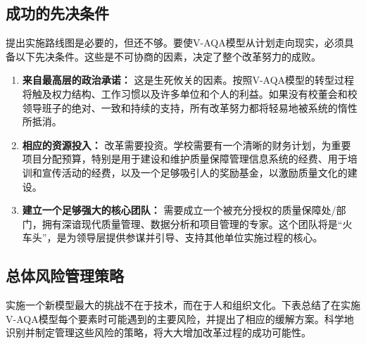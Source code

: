 \subsection{成功的先决条件}
\label{subsec:dieu_kien_thanh_cong}
提出实施路线图是必要的，但还不够。要使V-AQA模型从计划走向现实，必须具备以下先决条件。这些是不可协商的因素，决定了整个改革努力的成败。
\begin{enumerate}
    \item \textbf{来自最高层的政治承诺：} 这是生死攸关的因素。按照V-AQA模型的转型过程将触及权力结构、工作习惯以及许多单位和个人的利益。如果没有校董会和校领导班子的绝对、一致和持续的支持，所有改革努力都将轻易地被系统的惰性所抵消。
    
    \item \textbf{相应的资源投入：} 改革需要投资。学校需要有一个清晰的财务计划，为重要项目分配预算，特别是用于建设和维护质量保障管理信息系统的经费、用于培训和宣传活动的经费，以及一个足够吸引人的奖励基金，以激励质量文化的建设。
    
    \item \textbf{建立一个足够强大的核心团队：} 需要成立一个被充分授权的质量保障处/部门，拥有深谙现代质量管理、数据分析和项目管理的专家。这个团队将是“火车头”，是为领导层提供参谋并引导、支持其他单位实施过程的核心。
\end{enumerate}

\subsection{总体风险管理策略}
\label{subsec:quan_ly_rui_ro}
实施一个新模型最大的挑战不在于技术，而在于人和组织文化。下表总结了在实施V-AQA模型每个要素时可能遇到的主要风险，并提出了相应的缓解方案。科学地识别并制定管理这些风险的策略，将大大增加改革过程的成功可能性。

